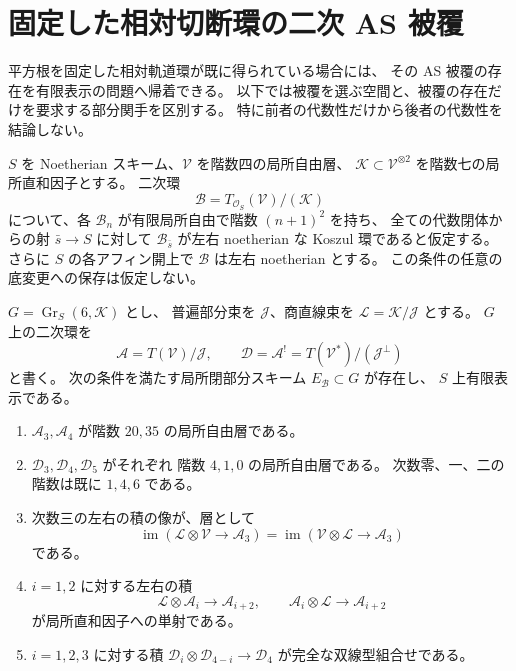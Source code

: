 \section{固定した相対切断環の二次 AS 被覆}
\label{sec:relative-as-cover}

平方根を固定した相対軌道環が既に得られている場合には、
その AS 被覆の存在を有限表示の問題へ帰着できる。
以下では被覆を選ぶ空間と、被覆の存在だけを要求する部分関手を区別する。
特に前者の代数性だけから後者の代数性を結論しない。

\begin{theorem}[二次被覆の相対有限判定]
\label{thm:relative-finite-as-cover}
$S$ を Noetherian スキーム、$\mathcal V$ を階数四の局所自由層、
$\mathcal K\subset\mathcal V^{\otimes2}$ を階数七の局所直和因子とする。
二次環
\[
 \mathcal B=T_{\mathcal O_S}(\mathcal V)/(\mathcal K)
\]
について、各 $\mathcal B_n$ が有限局所自由で階数 $(n+1)^2$ を持ち、
全ての代数閉体からの射 $\bar s\to S$ に対して
$\mathcal B_{\bar s}$ が左右 noetherian な Koszul 環であると仮定する。
さらに $S$ の各アフィン開上で $\mathcal B$ は左右 noetherian とする。
この条件の任意の底変更への保存は仮定しない。

$G=\operatorname{Gr}_S(6,\mathcal K)$ とし、
普遍部分束を $\mathcal J$、商直線束を
$\mathcal L=\mathcal K/\mathcal J$ とする。
$G$ 上の二次環を
\[
 \mathcal A=T(\mathcal V)/\mathcal J,\qquad
 \mathcal D=\mathcal A^!=T(\mathcal V^*)/(\mathcal J^\perp)
\]
と書く。
次の条件を満たす局所閉部分スキーム $E_{\mathcal B}\subset G$ が存在し、
$S$ 上有限表示である。
\begin{enumerate}
\item $\mathcal A_3,\mathcal A_4$ が階数 $20,35$ の局所自由層である。
\item $\mathcal D_3,\mathcal D_4,\mathcal D_5$ がそれぞれ
階数 $4,1,0$ の局所自由層である。
次数零、一、二の階数は既に $1,4,6$ である。
\item 次数三の左右の積の像が、層として
\[
 \operatorname{im}(\mathcal L\otimes\mathcal V\to\mathcal A_3)
 =\operatorname{im}(\mathcal V\otimes\mathcal L\to\mathcal A_3)
\]
である。
\item $i=1,2$ に対する左右の積
\[
 \mathcal L\otimes\mathcal A_i\longrightarrow\mathcal A_{i+2},
 \qquad
 \mathcal A_i\otimes\mathcal L\longrightarrow\mathcal A_{i+2}
\]
が局所直和因子への単射である。
\item $i=1,2,3$ に対する積
$\mathcal D_i\otimes\mathcal D_{4-i}\to\mathcal D_4$
が完全な双線型組合せである。
\end{enumerate}


\end{theorem}
